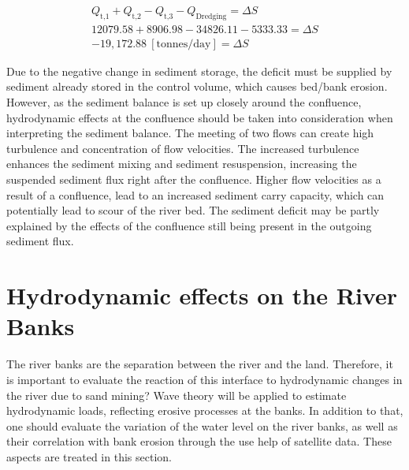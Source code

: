 \begin{subequations}\label{eq:sediment_balance}
    \begin{gather}
        Q_\text{t,1} + Q_\text{t,2} - Q_\text{t,3} - Q_\text{Dredging} = \Delta S \label{eq:sediment_balance_a} \\
        12079.58 + 8906.98 - 34826.11 - 5333.33 = \Delta S \label{eq:sediment_balance_b} \\
        -19{,}172.88~[\text{tonnes/day}] = \Delta S
        \label{eq:sediment_balance_c}
    \end{gather}
\end{subequations}

Due to the negative change in sediment storage, the deficit must be supplied by sediment already stored in the control volume, which causes bed/bank erosion. However, as the sediment balance is set up closely around the confluence, hydrodynamic effects at the confluence should be taken into consideration when interpreting the sediment balance. The meeting of two flows can create high turbulence and concentration of flow velocities. The increased turbulence enhances the sediment mixing and sediment resuspension, increasing the suspended sediment flux right after the confluence. Higher flow velocities as a result of a confluence, lead to an increased sediment carry capacity, which can potentially lead to scour of the river bed. The sediment deficit may be partly explained by the effects of the confluence still being present in the outgoing sediment flux.

\section{Hydrodynamic effects on the River Banks}
The river banks are the separation between the river and the land. Therefore, it is important to evaluate the reaction of this interface to hydrodynamic changes in the river due to sand mining? Wave theory will be applied to estimate hydrodynamic loads, reflecting erosive processes at the banks. In addition to that, one should evaluate the variation of the water level on the river banks, as well as their correlation with bank erosion through the use help of satellite data. These aspects are treated in this section.


